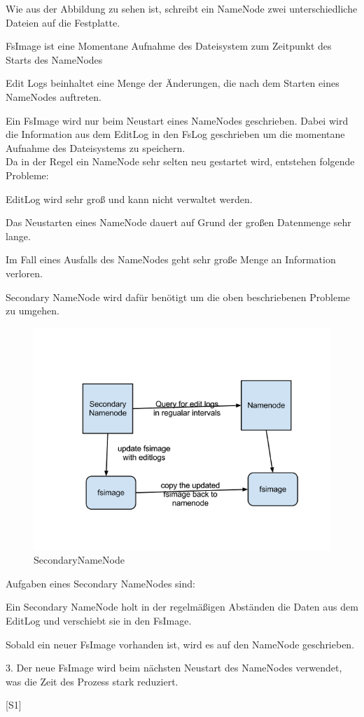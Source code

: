 Wie aus der Abbildung zu sehen ist, schreibt ein NameNode zwei unterschiedliche Dateien auf die Festplatte. \\
\begin{itemsize}
\item FsImage ist eine Momentane Aufnahme des Dateisystem zum Zeitpunkt des Starts des NameNodes
\item Edit Logs beinhaltet eine Menge der Änderungen, die nach dem Starten eines NameNodes auftreten.
\end{itemsize}
Ein FsImage wird nur beim Neustart eines NameNodes geschrieben. Dabei wird die Information aus dem EditLog in den FsLog geschrieben um die momentane Aufnahme des Dateisystems zu speichern.\\
Da in der Regel ein NameNode sehr selten neu gestartet wird, entstehen folgende Probleme:
\begin{itemsize}
\item EditLog wird sehr groß und kann nicht verwaltet werden.
\item Das Neustarten eines NameNode dauert auf Grund der großen Datenmenge sehr lange.
\item Im Fall eines Ausfalls des NameNodes geht sehr große Menge an Information verloren.
\end{itemsize}
Secondary NameNode wird dafür benötigt um die oben beschriebenen Probleme zu umgehen.\\
\begin{figure}
	\centering
	\includegraphics{images/secondarynamenode.png}
	\caption{SecondaryNameNode}
	\label{img:grafik-SecondaryNameNode}
\end{figure}
Aufgaben eines Secondary NameNodes sind:
\begin{itemsize}
\item Ein Secondary NameNode holt in der regelmäßigen Abständen die Daten aus dem EditLog und verschiebt sie in den FsImage.
\item Sobald ein neuer FsImage vorhanden ist, wird es auf den NameNode geschrieben.
\item 3. Der neue FsImage wird beim nächsten Neustart des NameNodes verwendet, was die Zeit des Prozess stark reduziert.
\end{itemsize}
[S1]
